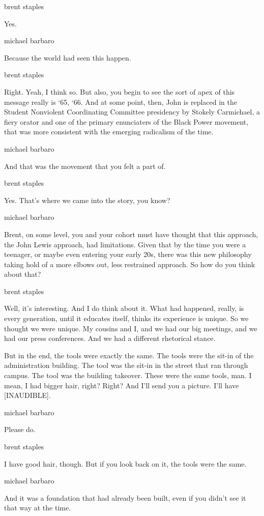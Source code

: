 brent staples

Yes.

michael barbaro

Because the world had seen this happen.

brent staples

Right. Yeah, I think so. But also, you begin to see the sort of apex of
this message really is `65, `66. And at some point, then, John is
replaced in the Student Nonviolent Coordinating Committee presidency by
Stokely Carmichael, a fiery orator and one of the primary enunciaters of
the Black Power movement, that was more consistent with the emerging
radicalism of the time.

michael barbaro

And that was the movement that you felt a part of.

brent staples

Yes. That's where we came into the story, you know?

michael barbaro

Brent, on some level, you and your cohort must have thought that this
approach, the John Lewis approach, had limitations. Given that by the
time you were a teenager, or maybe even entering your early 20s, there
was this new philosophy taking hold of a more elbows out, less
restrained approach. So how do you think about that?

brent staples

Well, it's interesting. And I do think about it. What had happened,
really, is every generation, until it educates itself, thinks its
experience is unique. So we thought we were unique. My cousins and I,
and we had our big meetings, and we had our press conferences. And we
had a different rhetorical stance.

But in the end, the tools were exactly the same. The tools were the
sit-in of the administration building. The tool was the sit-in in the
street that ran through campus. The tool was the building takeover.
These were the same tools, man. I mean, I had bigger hair, right? Right?
And I'll send you a picture. I'll have {[}INAUDIBLE{]}.

michael barbaro

Please do.

brent staples

I have good hair, though. But if you look back on it, the tools were the
same.

michael barbaro

And it was a foundation that had already been built, even if you didn't
see it that way at the time.


